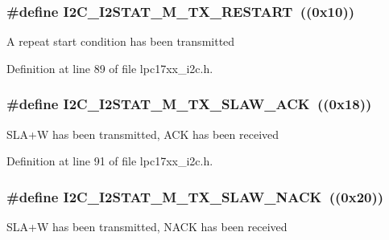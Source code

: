 \subsubsection[{\texorpdfstring{I2\+C\+\_\+\+I2\+S\+T\+A\+T\+\_\+\+M\+\_\+\+T\+X\+\_\+\+R\+E\+S\+T\+A\+RT}{I2C_I2STAT_M_TX_RESTART}}]{\setlength{\rightskip}{0pt plus 5cm}\#define I2\+C\+\_\+\+I2\+S\+T\+A\+T\+\_\+\+M\+\_\+\+T\+X\+\_\+\+R\+E\+S\+T\+A\+RT~((0x10))}\hypertarget{group___i2_c___private___macros_gad41d0d1392b7d905b22b9c5015f2e48f}{}\label{group___i2_c___private___macros_gad41d0d1392b7d905b22b9c5015f2e48f}
A repeat start condition has been transmitted 

Definition at line 89 of file lpc17xx\+\_\+i2c.\+h.

\subsubsection[{\texorpdfstring{I2\+C\+\_\+\+I2\+S\+T\+A\+T\+\_\+\+M\+\_\+\+T\+X\+\_\+\+S\+L\+A\+W\+\_\+\+A\+CK}{I2C_I2STAT_M_TX_SLAW_ACK}}]{\setlength{\rightskip}{0pt plus 5cm}\#define I2\+C\+\_\+\+I2\+S\+T\+A\+T\+\_\+\+M\+\_\+\+T\+X\+\_\+\+S\+L\+A\+W\+\_\+\+A\+CK~((0x18))}\hypertarget{group___i2_c___private___macros_gab91c158252efeb1a3a139faec3622ae0}{}\label{group___i2_c___private___macros_gab91c158252efeb1a3a139faec3622ae0}
S\+L\+A+W has been transmitted, A\+CK has been received 

Definition at line 91 of file lpc17xx\+\_\+i2c.\+h.

\subsubsection[{\texorpdfstring{I2\+C\+\_\+\+I2\+S\+T\+A\+T\+\_\+\+M\+\_\+\+T\+X\+\_\+\+S\+L\+A\+W\+\_\+\+N\+A\+CK}{I2C_I2STAT_M_TX_SLAW_NACK}}]{\setlength{\rightskip}{0pt plus 5cm}\#define I2\+C\+\_\+\+I2\+S\+T\+A\+T\+\_\+\+M\+\_\+\+T\+X\+\_\+\+S\+L\+A\+W\+\_\+\+N\+A\+CK~((0x20))}\hypertarget{group___i2_c___private___macros_ga15729d9436fbf4c23a22e7cdbc913552}{}\label{group___i2_c___private___macros_ga15729d9436fbf4c23a22e7cdbc913552}
S\+L\+A+W has been transmitted, N\+A\+CK has been received 

